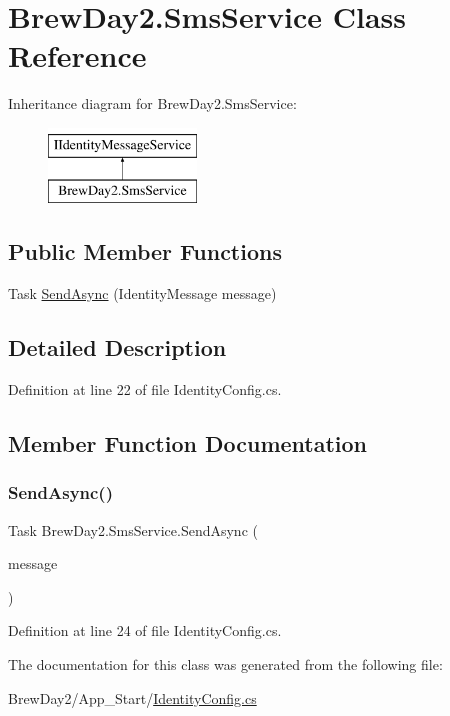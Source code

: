 \hypertarget{class_brew_day2_1_1_sms_service}{}\section{Brew\+Day2.\+Sms\+Service Class Reference}
\label{class_brew_day2_1_1_sms_service}
Inheritance diagram for Brew\+Day2.\+Sms\+Service\+:\begin{figure}[H]
\begin{center}
\leavevmode
\includegraphics[height=2.000000cm]{class_brew_day2_1_1_sms_service}
\end{center}
\end{figure}
\subsection*{Public Member Functions}
\begin{DoxyCompactItemize}
\item 
Task \mbox{\hyperlink{class_brew_day2_1_1_sms_service_acf4e71a5cf2476f29163660f294c0093}{Send\+Async}} (Identity\+Message message)
\end{DoxyCompactItemize}


\subsection{Detailed Description}


Definition at line 22 of file Identity\+Config.\+cs.



\subsection{Member Function Documentation}
\mbox{\label{class_brew_day2_1_1_sms_service_acf4e71a5cf2476f29163660f294c0093}} 
\subsubsection{\texorpdfstring{Send\+Async()}{SendAsync()}}
{\footnotesize\ttfamily Task Brew\+Day2.\+Sms\+Service.\+Send\+Async (\begin{DoxyParamCaption}\item[{Identity\+Message}]{message }\end{DoxyParamCaption})}



Definition at line 24 of file Identity\+Config.\+cs.



The documentation for this class was generated from the following file\+:\begin{DoxyCompactItemize}
\item 
Brew\+Day2/\+App\+\_\+\+Start/\mbox{\hyperlink{_identity_config_8cs}{Identity\+Config.\+cs}}\end{DoxyCompactItemize}
